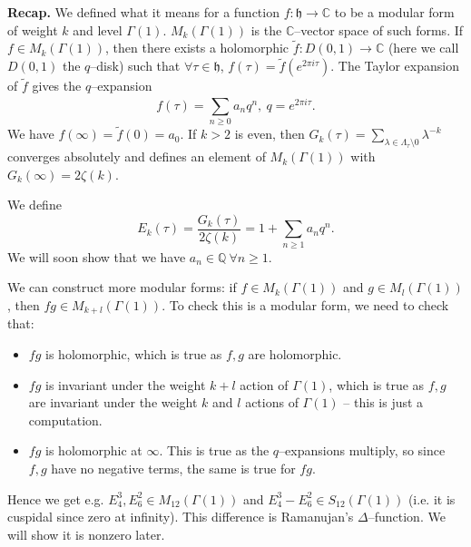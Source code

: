 \documentclass{article}
\theoremstyle{definition}
\begin{document}

\textbf{Recap.} We defined what it means for a function $f : \mathfrak{h} \to \mathbb{C}$ to be a modular form of weight $k$ and level $\Gamma(1)$. $M_k(\Gamma(1))$ is the $\mathbb{C}$--vector space of such forms. If $f \in M_k(\Gamma(1))$, then there exists a holomorphic $\tilde{f} : D(0,1) \to \mathbb{C}$ (here we call $D(0,1)$ the $q$--disk) such that $\forall \tau \in \mathfrak{h}$, $f(\tau) = \tilde{f}(e^{2\pi i \tau})$. The Taylor expansion of $\tilde{f}$ gives the $q$--expansion \[
f(\tau) = \sum_{n\ge 0}^{} a_nq^n, ~ q = e^{2\pi i \tau}.
\]
We have $f(\infty) = \tilde{f}(0)=a_0$. If $k>2$ is even, then $G_k(\tau) = \sum_{ \lambda \in \Lambda_{\tau}\setminus 0}^{} \lambda^{-k}$ converges absolutely and defines an element of $M_k(\Gamma(1))$ with $G_k(\infty)= 2\zeta(k)$.
\vspace{1mm}
 
We define $$E_k(\tau) = \frac{G_k(\tau)}{2\zeta(k)} = 1 + \sum_{n\ge 1}^{} a_nq^n.$$ We will soon show that we have $a_n \in \mathbb{Q} ~\forall n\ge 1$.
\vspace{1mm}
 
We can construct more modular forms: if $f \in M_k(\Gamma(1))$ and $g \in M_l(\Gamma(1))$, then $fg \in M_{k+l}(\Gamma(1))$. To check this is a modular form, we need to check that:
\begin{itemize}
    \item $fg$ is holomorphic, which is true as $f, g$ are holomorphic.
    \item $fg$ is invariant under the weight $k+l$ action of $\Gamma(1)$, which is true as $f,g$ are invariant under the weight $k$ and $l$ actions of $\Gamma(1)$ -- this is just a computation.
    \item $fg$ is holomorphic at $\infty$. This is true as the $q$--expansions multiply, so since $f, g$ have no negative terms, the same is true for $fg$.
\end{itemize}
Hence we get e.g. $E_4^3, E_6^2 \in M_{12}(\Gamma(1))$ and $E_4^3-E_6^2 \in S_{12}(\Gamma(1))$ (i.e. it is cuspidal since zero at infinity). This difference is Ramanujan's $\Delta$--function. We will show it is nonzero later. 
\vspace{1mm}
 
\end{document}
